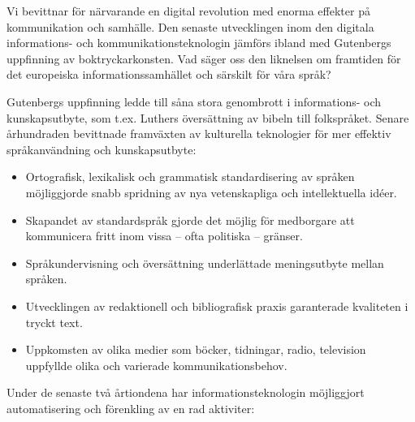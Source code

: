 \begin{multicols}{2}

Vi bevittnar för närvarande en digital revolution med enorma effekter
på kommunikation och samhälle. Den senaste utvecklingen inom den
digitala informations- och kommunika\-tions\-teknologin jämförs ibland
med Gutenbergs uppfinning av bok\-tryckar\-konsten. Vad säger oss den
liknelsen om fram\-tiden för det europeiska informations\-samhället
och särskilt för våra språk?


Gutenbergs uppfinning ledde till såna stora genombrott i informations-
och kunskaps\-utbyte, som t.ex. Luthers översättning av bibeln till
folkspråket. Senare århundraden bevittnade framväxten av kulturella
teknologier för mer effektiv språkanvändning och kunskapsutbyte:

\medskip
\begin{itemize}[itemsep=0pt,parsep=0pt]
\item Ortografisk, lexikalisk och grammatisk standardisering av
  språken möjliggjorde snabb spridning av nya vetenskapliga och
  intellektuella idéer.
\item Skapandet av standardspråk gjorde det möjlig för medborgare att
  kommunicera fritt inom vissa -- ofta politiska -- gränser.
\item Språkundervisning och översättning underlättade meningsutbyte
  mellan språken.
\item Utvecklingen av redaktionell och bibliografisk praxis
  garanterade kvaliteten i tryckt text.
\item Uppkomsten av olika medier som böcker, tidningar, radio,
  television uppfyllde olika och varierade kommunikationsbehov.
\end{itemize}

Under de senaste två årtiondena har informations\-teknologin
möjliggjort automatisering och förenkling av en rad aktiviter:


\end{multicols}
